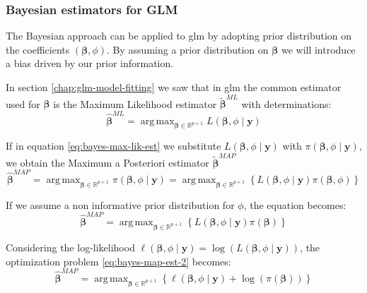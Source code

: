 \documentclass[a4paper, twoside, openright, 12pt]{report}
\DeclareMathOperator*{\argmax}{arg\,max}  %
\theoremstyle{definition}
\theoremstyle{definition}
\theoremstyle{definition}
\theoremstyle{remark}
\begin{document}
\hypertarget{bayesian-estimators-for-glm}{%
\subsubsection{Bayesian estimators for GLM}\label{bayesian-estimators-for-glm}}

The Bayesian approach can be applied to \ac{glm} by adopting prior distribution on the coefficients \((\boldsymbol{\beta}, \phi)\). By assuming a prior distribution on \(\boldsymbol{\beta}\) we will introduce a bias driven by our prior information.

In section \ref{chap:glm-model-fitting} we saw that in \ac{glm} the common estimator used for \(\boldsymbol{\beta}\) is the Maximum Likelihood estimator \(\tilde{\boldsymbol{\beta}}^{ML}\) with determinations:
\begin{equation}
\label{eq:bayes-max-lik-est}
\hat{\boldsymbol{\beta}}^{ML} = \argmax_{\boldsymbol{\beta}\in\mathbb{R}^{p+1}}{L\left(\boldsymbol{\beta}, \phi \mid \boldsymbol{y}\right)}
\end{equation}

If in equation \eqref{eq:bayes-max-lik-est} we substitute \(L\left(\boldsymbol{\beta}, \phi \mid \boldsymbol{y}\right)\) with \(\pi\left(\boldsymbol{\beta}, \phi \mid \boldsymbol{y}\right)\), we obtain the Maximum a Posteriori estimator \(\tilde{\boldsymbol{\beta}}^{MAP}\)
\begin{equation}
\label{eq:bayes-map-est-1}
\hat{\boldsymbol{\beta}}^{MAP} = \argmax_{\boldsymbol{\beta}\in\mathbb{R}^{p+1}}{\pi\left(\boldsymbol{\beta}, \phi \mid \boldsymbol{y}\right)}
=
\argmax_{\boldsymbol{\beta}\in\mathbb{R}^{p+1}}{\left\{L\left(\boldsymbol{\beta}, \phi \mid \boldsymbol{y}\right) \pi(\boldsymbol{\beta}, \phi) \right\}}
\end{equation}

If we assume a non informative prior distribution for \(\phi\), the equation becomes:
\begin{equation}
\label{eq:bayes-map-est-2}
\hat{\boldsymbol{\beta}}^{MAP} =
\argmax_{\boldsymbol{\beta}\in\mathbb{R}^{p+1}}{\left\{L\left(\boldsymbol{\beta}, \phi \mid \boldsymbol{y}\right) \pi(\boldsymbol{\beta}) \right\}}
\end{equation}

Considering the log-likelihood \(\ell\left(\boldsymbol{\beta}, \phi \mid \boldsymbol{y}\right) = \log{\left( L\left( \boldsymbol{\beta}, \phi \mid \boldsymbol{y} \right)\right)}\), the optimization problem \eqref{eq:bayes-map-est-2} becomes:
\begin{equation}
\label{eq:bayes-map-est-3}
\hat{\boldsymbol{\beta}}^{MAP} =
\argmax_{\boldsymbol{\beta}\in\mathbb{R}^{p+1}}{\left\{\ell\left(\boldsymbol{\beta}, \phi \mid \boldsymbol{y}\right) + \log{\left(\pi(\boldsymbol{\beta})\right)} \right\}}
\end{equation}
\end{document}
